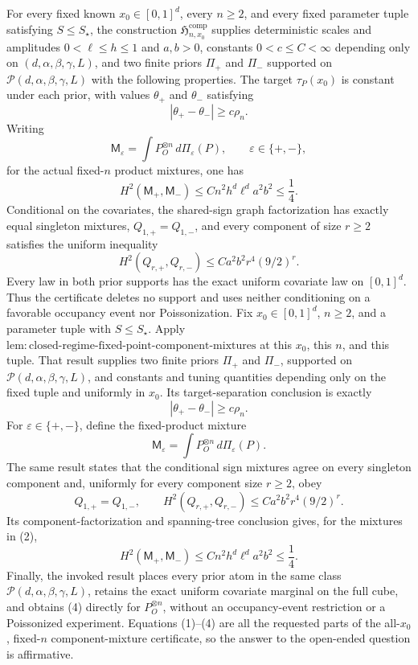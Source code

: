 For every fixed known \(x_0\in[0,1]^d\), every \(n\ge2\), and every fixed parameter tuple satisfying \(S\le S_\star\), the construction \(\mathfrak H_{n,x_0}^{\mathrm{comp}}\) supplies deterministic scales and amplitudes \(0<\ell\le h\le1\) and \(a,b>0\), constants \(0<c\le C<\infty\) depending only on \((d,\alpha,\beta,\gamma,L)\), and two finite priors \(\Pi_+\) and \(\Pi_-\) supported on \(\mathcal P(d,\alpha,\beta,\gamma,L)\) with the following properties.  The target \(\tau_P(x_0)\) is constant under each prior, with values \(\theta_+\) and \(\theta_-\) satisfying
\[
 |\theta_+-\theta_-|\ge c\rho_n.
\]
Writing
\[
 \mathsf M_\varepsilon=\int P_O^{\otimes n}\,d\Pi_\varepsilon(P),
 \qquad \varepsilon\in\{+,-\},
\]
for the actual fixed-\(n\) product mixtures, one has
\[
 H^2(\mathsf M_+,\mathsf M_-)\le
 Cn^2h^d\ell^da^2b^2\le\frac14.
\]
Conditional on the covariates, the shared-sign graph factorization has exactly equal singleton mixtures, \(Q_{1,+}=Q_{1,-}\), and every component of size \(r\ge2\) satisfies the uniform inequality
\[
 H^2(Q_{r,+},Q_{r,-})\le Ca^2b^2r^4(9/2)^r.
\]
Every law in both prior supports has the exact uniform covariate law on \([0,1]^d\).  Thus the certificate deletes no support and uses neither conditioning on a favorable occupancy event nor Poissonization.
Fix \(x_0\in[0,1]^d\), \(n\ge2\), and a parameter tuple with \(S\le S_\star\).  Apply \(\mathrm{lem:closed\mbox{-}regime\mbox{-}fixed\mbox{-}point\mbox{-}component\mbox{-}mixtures}\) at this \(x_0\), this \(n\), and this tuple.  That result supplies two finite priors \(\Pi_+\) and \(\Pi_-\), supported on \(\mathcal P(d,\alpha,\beta,\gamma,L)\), and constants and tuning quantities depending only on the fixed tuple and uniformly in \(x_0\).  Its target-separation conclusion is exactly
\[
 |\theta_+-\theta_-|\ge c\rho_n. \tag{1}
\]
For \(\varepsilon\in\{+,-\}\), define the fixed-product mixture
\[
 \mathsf M_\varepsilon
 =\int P_O^{\otimes n}\,d\Pi_\varepsilon(P). \tag{2}
\]
The same result states that the conditional sign mixtures agree on every singleton component and, uniformly for every component size \(r\ge2\), obey
\[
 Q_{1,+}=Q_{1,-},
 \qquad
 H^2(Q_{r,+},Q_{r,-})\le Ca^2b^2r^4(9/2)^r. \tag{3}
\]
Its component-factorization and spanning-tree conclusion gives, for the mixtures in (2),
\[
 H^2(\mathsf M_+,\mathsf M_-)
 \le Cn^2h^d\ell^da^2b^2
 \le\frac14. \tag{4}
\]
Finally, the invoked result places every prior atom in the same class \(\mathcal P(d,\alpha,\beta,\gamma,L)\), retains the exact uniform covariate marginal on the full cube, and obtains (4) directly for \(P_O^{\otimes n}\), without an occupancy-event restriction or a Poissonized experiment.  Equations (1)--(4) are all the requested parts of the all-\(x_0\), fixed-\(n\) component-mixture certificate, so the answer to the open-ended question is affirmative.
